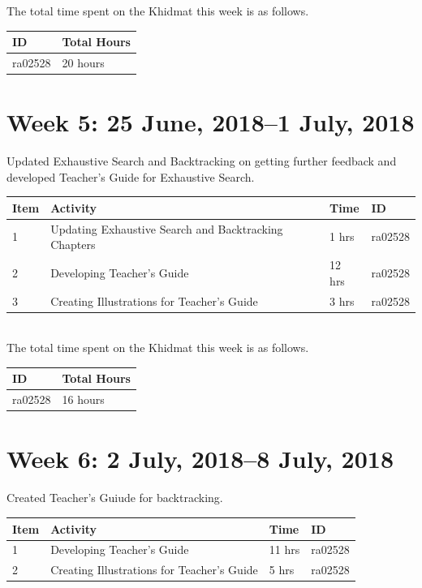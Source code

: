 \documentclass{article}
\begin{document}
The total time spent on the Khidmat this week is as follows.

\begin{tabular}{|l|l|}
  \hline
  ID & Total Hours\\\hline\hline
  ra02528 & 20 hours\\\hline
\end{tabular}


\newpage %
\section*{Week 5: 25 June, 2018--1 July, 2018}
Updated Exhaustive Search and Backtracking on getting further feedback and developed Teacher's Guide for Exhaustive Search.\\


\begin{tabular}{|l|l|l|l|}
  \hline
  Item 	& Activity & Time & ID \\\hline\hline
  1	& Updating Exhaustive Search and Backtracking Chapters & 1 hrs & ra02528 \\\hline
  2	& Developing Teacher's Guide & 12 hrs & ra02528 \\\hline
  3	& Creating Illustrations for Teacher's Guide & 3 hrs & ra02528 \\\hline
\end{tabular}\\

The total time spent on the Khidmat this week is as follows.

\begin{tabular}{|l|l|}
  \hline
  ID & Total Hours\\\hline\hline
  ra02528 & 16 hours\\\hline
\end{tabular}

\newpage %
\section*{Week 6: 2 July, 2018--8 July, 2018}
Created Teacher's Guiude for backtracking.\\


\begin{tabular}{|l|l|l|l|}
  \hline
  Item 	& Activity & Time & ID \\\hline\hline
  1	& Developing Teacher's Guide & 11 hrs & ra02528 \\\hline
  2	& Creating Illustrations for Teacher's Guide & 5 hrs & ra02528 \\\hline
\end{tabular}\\
\end{document}
